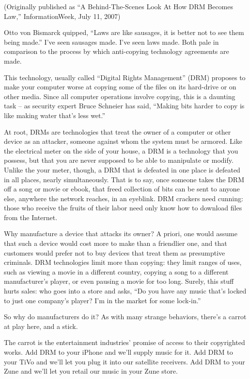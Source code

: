 (Originally published as ``A Behind-The-Scenes Look At How DRM
Becomes Law,'' InformationWeek, July 11, 2007)

Otto von Bismarck quipped, ``Laws are like sausages, it is better
not to see them being made.'' I've seen sausages made. I've seen
laws made. Both pale in comparison to the process by which
anti-copying technology agreements are made.

This technology, usually called ``Digital Rights Management'' (DRM)
proposes to make your computer worse at copying some of the files
on its hard-drive or on other media. Since all computer operations
involve copying, this is a daunting task -- as security expert
Bruce Schneier has said, ``Making bits harder to copy is like making
water that's less wet.''

At root, DRMs are technologies that treat the owner of a computer
or other device as an attacker, someone against whom the system
must be armored. Like the electrical meter on the side of your
house, a DRM is a technology that you possess, but that you are
never supposed to be able to manipulate or modify. Unlike the your
meter, though, a DRM that is defeated in one place is defeated in
all places, nearly simultaneously. That is to say, once someone
takes the DRM off a song or movie or ebook, that freed collection
of bits can be sent to anyone else, anywhere the network reaches,
in an eyeblink. DRM crackers need cunning: those who receive the
fruits of their labor need only know how to download files from the
Internet.

Why manufacture a device that attacks its owner? A priori, one
would assume that such a device would cost more to make than a
friendlier one, and that customers would prefer not to buy devices
that treat them as presumptive criminals. DRM technologies limit
more than copying: they limit ranges of uses, such as viewing a
movie in a different country, copying a song to a different
manufacturer's player, or even pausing a movie for too long.
Surely, this stuff hurts sales: who goes into a store and asks, ``Do
you have any music that's locked to just one company's player? I'm
in the market for some lock-in.''

So why do manufacturers do it? As with many strange behaviors,
there's a carrot at play here, and a stick.

The carrot is the entertainment industries' promise of access to
their copyrighted works. Add DRM to your iPhone and we'll supply
music for it. Add DRM to your TiVo and we'll let you plug it into
our satellite receivers. Add DRM to your Zune and we'll let you
retail our music in your Zune store.

